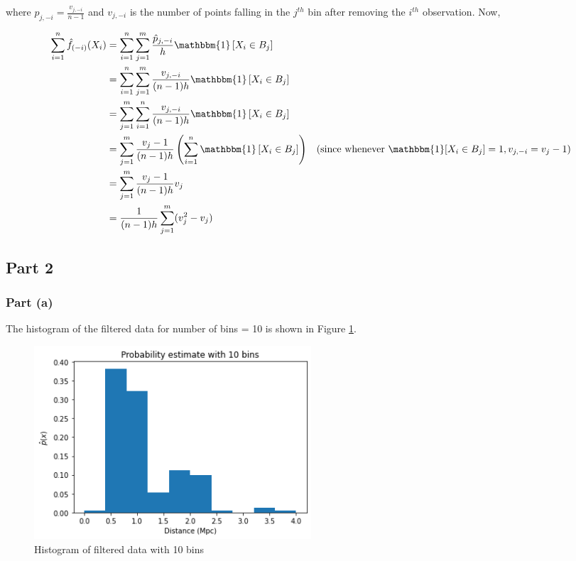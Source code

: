 \hspace{-19pt} where $\hat{p}_{j, -i} = \frac{v_{j, -i}}{n-1}$ and $v_{j, -i}$ is the number of points falling in the $j^{th}$ bin after removing the $i^{th}$ observation. Now, 

\begin{align*}
    \sum_{i=1}^n \hat{f}_{(-i)}(X_i) &= \sum_{i=1}^n \sum_{j=1}^m \frac{\hat{p}_{j, -i}}{h} \mathbbm{1}\left[X_i \in B_j\right] \\
    &= \sum_{i=1}^n\sum_{j=1}^m \frac{v_{j, -i}}{(n-1)h} \mathbbm{1}\left[X_i \in B_j\right] \\
    &= \sum_{j=1}^m \sum_{i=1}^n \frac{v_{j, -i}}{(n-1)h} \mathbbm{1}\left[X_i \in B_j\right] \\
    &= \sum_{j=1}^m \frac{v_{j}-1}{(n-1)h} \left( \sum_{i=1}^n \mathbbm{1}\left[X_i \in B_j\right]\right) & (\text{since whenever }\mathbbm{1}[X_i \in B_j] = 1, v_{j, -i} = v_j - 1 ) \\
    &= \sum_{j=1}^m \frac{v_{j} -1}{(n-1)h} v_j \\
    &= \frac{1}{(n-1)h} \sum_{j=1}^m (v_j^2 - v_j)
\end{align*}

\subsection{Part 2}

\subsubsection{Part (a)}

The histogram of the filtered data for number of bins = 10 is shown in Figure \ref{fig:q1_2_a}.

\begin{figure}[H]
    \centering
    \includegraphics[width=0.5\textwidth]{../q1/images/10binhistogram.png}
    \caption{Histogram of filtered data with 10 bins}
    \label{fig:q1_2_a}
\end{figure}

